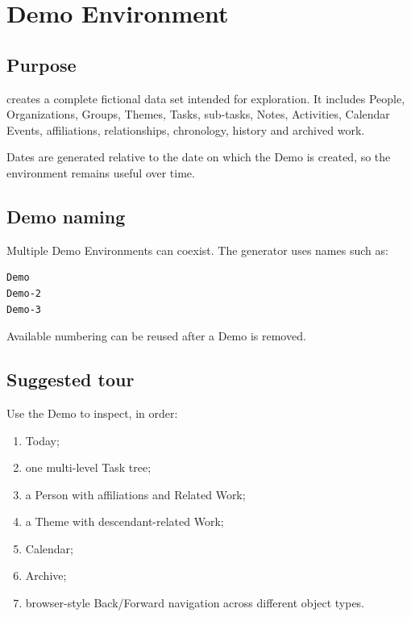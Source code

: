 \documentclass{testudomanual}
\begin{document}
\chapter{Demo Environment}

\section{Purpose}

 creates a complete fictional data set intended for exploration. It includes People, Organizations, Groups, Themes, Tasks, sub-tasks, Notes, Activities, Calendar Events, affiliations, relationships, chronology, history and archived work.

Dates are generated relative to the date on which the Demo is created, so the environment remains useful over time.

\section{Demo naming}

Multiple Demo Environments can coexist. The generator uses names such as:
\begin{lstlisting}
Demo
Demo-2
Demo-3
\end{lstlisting}

Available numbering can be reused after a Demo is removed.

\section{Suggested tour}

Use the Demo to inspect, in order:
\begin{enumerate}
    \item Today;
    \item one multi-level Task tree;
    \item a Person with affiliations and Related Work;
    \item a Theme with descendant-related Work;
    \item Calendar;
    \item Archive;
    \item browser-style Back/Forward navigation across different object types.
\end{enumerate}

\end{document}
